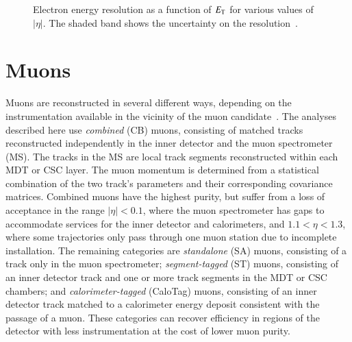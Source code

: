 \begin{figure}[htbp]
{	}
	\hfill
	\caption{Electron energy resolution as a function of $E_{\text{T}}$ for various values of $|\eta|$. The shaded band shows the uncertainty on the resolution~\cite{TheATLASCollaboration:2014gf}.}
	\label{fig:reco-el-EER}
\end{figure}

\section{Muons}\label{sec:event-reconstruction-muons}
Muons are reconstructed in several different ways, depending on the instrumentation available in the vicinity of the muon candidate~\cite{TheATLASCollaboration:2014bm}. The analyses described here use \emph{combined} (CB) muons, consisting of matched tracks reconstructed independently in the inner detector and the muon spectrometer (MS). The tracks in the MS are local track segments reconstructed within each MDT or CSC layer. The muon momentum is determined from a statistical combination of the two track's parameters and their corresponding covariance matrices. Combined muons have the highest purity, but suffer from a loss of acceptance in the range $|\eta|<0.1$, where the muon spectrometer has gaps to accommodate services for the inner detector and calorimeters, and $1.1<\eta<1.3$, where some trajectories only pass through one muon station due to incomplete installation. The remaining categories are \emph{standalone} (SA) muons, consisting of a track only in the muon spectrometer; \emph{segment-tagged} (ST) muons, consisting of an inner detector track and one or more track segments in the MDT or CSC chambers; and \emph{calorimeter-tagged} (CaloTag) muons, consisting of an inner detector track matched to a calorimeter energy deposit consistent with the passage of a muon. These categories can recover efficiency in regions of the detector with less instrumentation at the cost of lower muon purity. 

